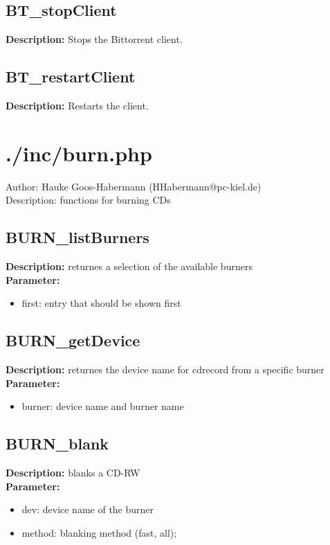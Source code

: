 \subsection{BT\_stopClient}
\textbf{Description:} Stops the Bittorrent client.\\

\subsection{BT\_restartClient}
\textbf{Description:} Restarts the client.\\

\newpage\section{./inc/burn.php}
 Author: Hauke Goos-Habermann (HHabermann@pc-kiel.de)\\
 Description: functions for burning CDs\\

\subsection{BURN\_listBurners}
\textbf{Description:} returnes a selection of the available burners\\
\textbf{Parameter:}
\begin{itemize}
\item first: entry that should be shown first
\end{itemize}

\subsection{BURN\_getDevice}
\textbf{Description:} returnes the device name for cdrecord from a specific burner\\
\textbf{Parameter:}
\begin{itemize}
\item burner: device name and burner name
\end{itemize}

\subsection{BURN\_blank}
\textbf{Description:} blanks a CD-RW\\
\textbf{Parameter:}
\begin{itemize}
\item dev: device name of the burner
\item method: blanking method (fast, all);
\end{itemize}

